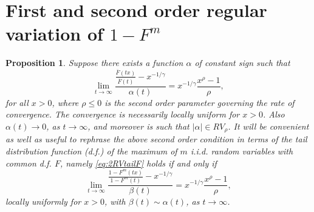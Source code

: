 \documentclass[11pt, a4paper, oneside]{article}
\numberwithin{equation}{section}
\theoremstyle{plain}
\newtheorem{prop}[thm]{Proposition}
\theoremstyle{definition}
\newcommand{\limit}[1]{\ensuremath{\displaystyle {\lim_{#1 \rightarrow{\infty}}}}}
\begin{document}
\section{First and second order regular variation of $1-F^m$}\label{App:DoAFm}

\begin{prop}
Suppose there exists a function $\alpha$ of constant sign such that
\begin{equation}\label{eq:2RVtailF}
	\limit{t} \frac{ \frac{\overline{F}(tx)}{\overline{F}(t)} - x^{-1/\gamma}}{\alpha(t)} = x^{-1/\gamma} \frac{x^{\rho}-1}{\rho},
\end{equation}
for all $x>0$, where $\rho \leq 0$ is the second order parameter governing the rate of convergence. The convergence is necessarily locally uniform for $x>0$. Also $\alpha(t) \rightarrow 0$, as $t \rightarrow \infty$, and moreover is such that $|\alpha| \in RV_{\rho}$. It will be convenient as well as useful to rephrase the above second order condition in terms of the tail distribution function (d.f.) of the maximum of $m$ i.i.d. random variables with common d.f. $F$, namely \eqref{eq:2RVtailF} holds if and only if
\begin{equation*}
\limit{t} \frac{ \frac{1-F^m(tx)}{1-F^m(t)} - x^{-1/\gamma}}{\beta(t)} = x^{-1/\gamma} \frac{x^{\rho}-1}{\rho},
\end{equation*}
locally uniformly for $x>0$, with $\beta(t) \sim \alpha(t)$, as $t \rightarrow \infty$.
\end{prop}
\end{document}
